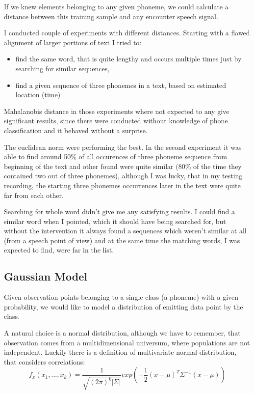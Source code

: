 \documentclass[12pt,a4paper,english]{article}
\begin{document}
If we knew elements belonging to any given phoneme, we could calculate a distance between this training sample and any encounter speech signal.

\newpage

I conducted couple of experiments with different distances.
Starting with a flawed alignment of larger portions of text I tried to:
\begin{itemize}
	\item find the same word, that is quite lengthy and occurs multiple times just by searching for similar sequences,
	\item find a given sequence of three phonemes in a text, based on estimated location (time)
\end{itemize}

Mahalanobis distance in those experiments where not expected to any give significant results,
since there were conducted without knowledge of phone classification and it behaved without a surprise. \newline


The euclidean norm were performing the best. \newline
In the second experiment it was able to find around 50\% of all occurences of three phoneme sequence from beginning of the text and other found were quite similar (80\% of the time they contained two out of three phonemes), although I was lucky, that in my testing recording, the starting three phonemes occurrences later in the text were quite far from each other. \newline


Searching for whole word didn't give me any satisfying results. I could find a similar word when I pointed, which it should have being searched for,
but without the intervention it always found a sequences which weren't similar at all (from a speech point of view) and at the same time the matching words, I was expected to find, were far in the list.

\newpage
\subsection{Gaussian Model}

Given observation points belonging to a single class (a phoneme) with a given probability,
we would like to model a distribution of emitting data point by the class. \newline


A natural choice is a normal distribution, although we have to remember, that observation comes from a multidimensional universum, where populations are not independent. \newline
Luckily there is a definition of multivariate normal distribution, that considers correlations:
\begin{equation}
    f_x(x_1,...,x_k) = \frac{1}{\sqrt{(2\pi)^k |{\Sigma}| }}exp(-\frac{1}{2}(x-\mu)^T{\Sigma}^{-1}(x-\mu))
\end{equation}
                       
\end{document}
